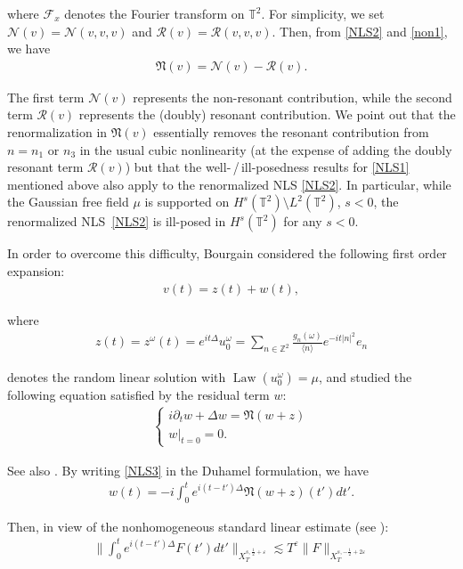 \documentclass[%
11pt,  reqno]{amsart}
\newcommand{\1}{\hspace{0.2mm}\text{I}\hspace{0.2mm}}
\newcommand{\noi}{\noindent}
\newcommand{\Z}{\mathbb{Z}}
\newcommand{\T}{\mathbb{T}}
\newcommand{\F}{\mathcal{F}}
\newcommand{\Nf}{\mathfrak{N}}
\newcommand{\Dl}{\Delta}
\newcommand{\eps}{\varepsilon}
\renewcommand{\o}{\omega}
\newcommand{\les}{\lesssim}
\newcommand{\jb}[1]
{\langle #1 \rangle}
\newcommand{\NN}{\mathcal{N}}
\newcommand{\RR}{\mathcal{R}}
\numberwithin{equation}{section}
\numberwithin{theorem}{section}
\DeclareMathOperator{\Law}{Law}
\begin{document}
\noi
where $\F_x$ denotes the Fourier transform on $\T^2$.
For simplicity, 
we set
$\NN(v) = \NN(v, v, v)$
and $\RR(v) = \RR(v, v, v)$.
Then, from \eqref{NLS2} and \eqref{non1}, we have 
\begin{align}
\Nf(v) =  \NN (v) - \RR (v).
\label{non2}
\end{align}


\noi
The first term $\NN(v)$ represents the non-resonant contribution, 
while 
the second term $\RR(v)$ represents the (doubly) resonant contribution.
We point out that 
the renormalization in $\Nf(v)$
essentially removes the resonant contribution from $n = n_1$ or $n_3$
in the usual cubic nonlinearity (at the expense
of adding the doubly resonant term $\RR(v)$)
but that 
the well-\,/\,ill-posedness
results for \eqref{NLS1} mentioned above
also apply to the renormalized NLS \eqref{NLS2}.
In particular, 
while the Gaussian free field $\mu$ is supported on  $H^s(\T^2) \setminus L^2(\T^2)$, 
$s < 0$, 
the renormalized NLS~\eqref{NLS2} is ill-posed in $H^s(\T^2)$
for any $s < 0$.


In order to overcome this difficulty, 
Bourgain \cite{BO96}
considered the following first order expansion:
\begin{align*}
v(t) = z(t) + w(t),  
\end{align*}

\noi
where 
\begin{align}
z(t)= z^\o(t) = e^{it \Dl} u_0^\o
=  \sum_{n \in \Z^2 } \frac{ g_n(\o)}{\jb{n}} e^{-it|n|^2}e_n
\label{lin1}
\end{align}

\noi
 denotes the random linear solution with $\Law(u_0^\o) = \mu$, 
and studied the following equation satisfied by the residual term $w$:
\begin{align}
\label{NLS3}
\begin{cases}
i \partial_t w + \Delta w = 
\Nf(w+z)\\
w|_{t = 0} = 0.
\end{cases}
\end{align}

\noi
See also \cite{McK, DPD}.
By writing \eqref{NLS3} in the Duhamel formulation, we have
\begin{align*}
w(t) = - i \int_0^t e^{i (t - t') \Dl} \Nf(w+z)(t') dt'.
\end{align*}

\noi
Then, 
in view of 
the nonhomogeneous standard linear estimate (see
\cite{BO93, KPV93, TAO}):
\begin{align*}
\bigg\| \int_0^te^{i(t- t')\Dl} F(t') dt' \bigg\|_{X^{s, \frac 12 + \eps}_T}\les 
T^\eps \|F\|_{X^{s, - \frac 12 + 2\eps}_T}
\end{align*}
\end{document}
